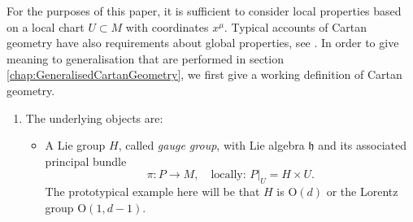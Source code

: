 \documentclass[11pt,a4paper]{article}
\numberwithin{equation}{section}
\begin{document}
For the purposes of this paper, it is sufficient to consider local properties based on a local chart $U \subset M$ with coordinates $x^\mu$. Typical accounts of Cartan geometry have also requirements about global properties, see \cite{cap2009parabolic}. In order to give meaning to generalisation that are performed in section \ref{chap:GeneralisedCartanGeometry}, we first give a working definition of Cartan geometry.
\begin{enumerate}
    \item The underlying objects are:
    \begin{itemize}
        \item A Lie group $H$, called \textit{gauge group}, with Lie algebra $\mathfrak{h}$ and its associated principal bundle
        \begin{equation}
            \pi: P \rightarrow M, \quad \text{locally: } P \vert_U = H \times U. \label{eq:PrincipalBundleDefinition}
        \end{equation}
        The prototypical example here will be that $H$ is O$(d)$ or the Lorentz group O$(1,d-1)$. 
        

\end{itemize}
\end{enumerate}
\end{document}

